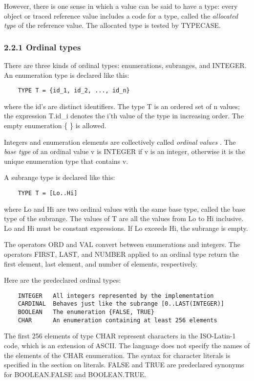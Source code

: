 \documentclass[10pt]{article}
\begin{document}
 However, there is one sense in which a value can be said to have a type: every object or traced reference value includes a code for a type, called the \emph{allocated type}
 of the reference value. The allocated type is tested by TYPECASE. 


 
\subsubsection*{2.2.1 Ordinal types}


  There are three kinds of ordinal types: enumerations, subranges, and INTEGER. An enumeration type is declared like this: 
\begin{verbatim}
    TYPE T = {id_1, id_2, ..., id_n}
\end{verbatim}
 where the id's are distinct identifiers. The type T is an ordered set of n values; the expression T.id\_i denotes the i'th value of the type in increasing order. The empty enumeration \{ \} is allowed. 


 Integers and enumeration elements are collectively called \emph{ordinal values}
. The \emph{base type}
 of an ordinal value v is INTEGER if v is an integer, otherwise it is the unique enumeration type that contains v. 


 A subrange type is declared like this: 
\begin{verbatim}
    TYPE T = [Lo..Hi]
\end{verbatim}
 where Lo and Hi are two ordinal values with the same base type, called the base type of the subrange. The values of T are all the values from Lo to Hi inclusive. Lo and Hi must be constant expressions. If Lo exceeds Hi, the subrange is empty. 


  The operators ORD and VAL convert between enumerations and integers. The operators FIRST, LAST, and NUMBER applied to an ordinal type return the first element, last element, and number of elements, respectively. 


 Here are the predeclared ordinal types: 
\begin{verbatim}
    INTEGER   All integers represented by the implementation
    CARDINAL  Behaves just like the subrange [0..LAST(INTEGER)]
    BOOLEAN   The enumeration {FALSE, TRUE}
    CHAR      An enumeration containing at least 256 elements
\end{verbatim}
 The first 256 elements of type CHAR represent characters in the ISO-Latin-1 code, which is an extension of ASCII. The language does not specify the names of the elements of the CHAR enumeration. The syntax for character literals is specified in the section on literals. FALSE and TRUE are predeclared synonyms for BOOLEAN.FALSE and BOOLEAN.TRUE. 
\end{document}
